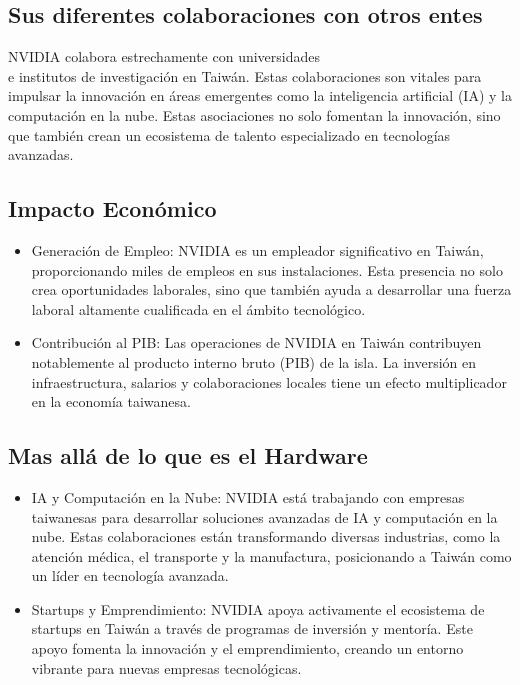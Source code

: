 \documentclass[twocolumn, 12pt]{article}
\begin{document}
\subsection*{Sus diferentes colaboraciones con otros entes}

NVIDIA colabora estrechamente con universidades \\
e institutos de investigación en Taiwán. Estas colaboraciones son vitales para
impulsar la innovación en áreas emergentes como la inteligencia
artificial (IA) y la computación en la nube. Estas asociaciones no
solo fomentan la innovación, sino que también crean un ecosistema de
talento especializado en tecnologías avanzadas.

\subsection*{Impacto Económico}

\begin{itemize}
      \item Generación de Empleo:
            NVIDIA es un empleador significativo en Taiwán,
            proporcionando miles de empleos en sus instalaciones.
            Esta presencia no solo crea oportunidades laborales, sino
            que también ayuda a desarrollar una fuerza laboral altamente
            cualificada en el ámbito tecnológico.

      \item Contribución al PIB:\@{}
            Las operaciones de NVIDIA en Taiwán contribuyen
            notablemente al producto interno bruto (PIB) de
            la isla. La inversión en infraestructura, salarios y
            colaboraciones locales tiene un efecto multiplicador en
            la economía taiwanesa.

\end{itemize}

\subsection{Mas allá de lo que es el Hardware}

\begin{itemize}
      \item IA y Computación en la Nube:
            NVIDIA está trabajando con empresas taiwanesas para
            desarrollar soluciones avanzadas de IA y computación en
            la nube. Estas colaboraciones están transformando diversas
            industrias, como la atención médica, el transporte y la
            manufactura, posicionando a Taiwán como un líder en
            tecnología avanzada.

      \item Startups y Emprendimiento:
            NVIDIA apoya activamente el ecosistema de startups en
            Taiwán a través de programas de inversión y mentoría.
            Este apoyo fomenta la innovación y el emprendimiento,
            creando un entorno vibrante para nuevas empresas tecnológicas.

\end{itemize}
\end{document}
